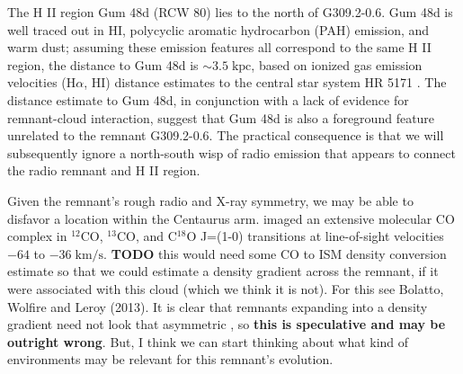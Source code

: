 \documentclass[preprint2,tighten,trackchanges]{aastex6}
\newcommand*{\mt}{\mathrm}
\newcommand*{\unit}[1]{\;\mt{#1}}  %
\newcommand*{\abt}{\mathord{\sim}} %
\begin{document}
The H II region Gum 48d (RCW 80) lies to the north of G309.2-0.6.
Gum 48d is well traced out in HI, polycyclic aromatic hydrocarbon (PAH)
emission, and warm dust; assuming these emission features all correspond to the
same H II region, the distance to Gum 48d is $\abt 3.5\unit{kpc}$, based on
ionized gas emission velocities (H$\alpha$, HI) distance estimates to the
central star system HR 5171 \citep{karr2009}.
The distance estimate to Gum 48d, in conjunction with a lack of evidence for
remnant-cloud interaction, suggest that Gum 48d is also a foreground feature
unrelated to the remnant G309.2-0.6.  The practical consequence is that we will
subsequently ignore a north-south wisp of radio emission that appears to
connect the radio remnant and H II region.

Given the remnant's rough radio and X-ray symmetry, we may be able to disfavor
a location within the Centaurus arm.  \citet{saito2001} imaged
an extensive molecular CO complex in ${}^{12}$CO, ${}^{13}$CO, and C${}^{18}$O
J=(1-0) transitions at line-of-sight velocities $-64$ to $-36 \unit{km/s}$.
\textbf{TODO} this would need some CO to ISM density conversion estimate so
that we could estimate a density gradient across the remnant, if it were
associated with this cloud (which we think it is not).
For this see Bolatto, Wolfire and Leroy (2013).
It is clear that remnants expanding into a density gradient need not look that
asymmetric \citep{williams2013}, so \textbf{this is speculative and may be
outright wrong}.
But, I think we can start thinking about what kind of environments may be
relevant for this remnant's evolution.
%


\end{document}
